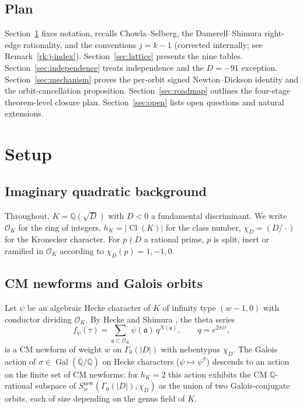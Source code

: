 \documentclass[11pt,a4paper]{amsart}
\theoremstyle{plain}
\theoremstyle{definition}
\DeclareMathOperator{\Cl}{Cl}
\DeclareMathOperator{\Gal}{Gal}
\newcommand{\Q}{\mathbb{Q}}
\newcommand{\OK}{\mathcal{O}_K}
\newcommand{\fraka}{\mathfrak{a}}
\newcommand{\absD}{\lvert D\rvert}
\begin{document}
\subsection{Plan}

Section~\ref{sec:setup} fixes notation, recalls Chowla--Selberg, the
Damerell--Shimura right-edge rationality, and the conventions $j = k-1$
(corrected internally; see Remark~\ref{rk:j-index}).
Section~\ref{sec:lattice} presents the nine tables.
Section~\ref{sec:independence} treats independence and the $D=-91$ exception.
Section~\ref{sec:mechanism} proves the per-orbit signed Newton--Dickson identity
and the orbit-cancellation proposition.
Section~\ref{sec:roadmap} outlines the four-stage theorem-level closure plan.
Section~\ref{sec:open} lists open questions and natural extensions.

\section{Setup}\label{sec:setup}

\subsection{Imaginary quadratic background}\label{ss:setup-K}

Throughout, $K = \Q(\sqrt{D})$ with $D < 0$ a fundamental discriminant. We
write $\OK$ for the ring of integers, $h_K = \lvert\Cl(K)\rvert$ for the
class number, $\chi_D = (D/\cdot)$ for the Kronecker character. For
$p \nmid D$ a rational prime, $p$ is split, inert or ramified in $\OK$
according to $\chi_D(p) = 1, -1, 0$.

\subsection{CM newforms and Galois orbits}\label{ss:setup-cm}

Let $\psi$ be an algebraic Hecke character of $K$ of infinity type $(w-1, 0)$
with conductor dividing $\OK$. By Hecke \cite{Hecke1936} and Shimura
\cite[\S\S 3.4, 7.6]{Shimura1971}, the theta series
\[
   f_\psi(\tau) = \sum_{\fraka\subset\OK}\psi(\fraka)\,q^{N(\fraka)},\qquad
   q = e^{2\pi i\tau},
\]
is a CM newform of weight $w$ on $\Gamma_0(\absD)$ with nebentypus
$\chi_D$. The Galois action of
$\sigma\in\Gal(\overline{\Q}/\Q)$ on Hecke characters
($\psi\mapsto\psi^\sigma$) descends to an action on the
finite set of CM newforms; for $h_K = 2$ this action exhibits the CM
$\Q$-rational subspace of $S_w^{\mathrm{new}}(\Gamma_0(\absD), \chi_D)$ as the
union of two Galois-conjugate orbits, each of size depending on the genus
field of $K$.
\end{document}

